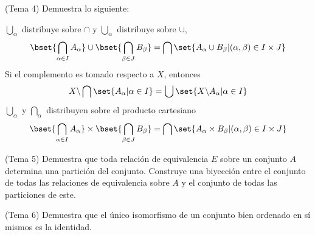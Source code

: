 \documentclass[fc]{tarea}
\newcommand{\menos}{\backslash}
\begin{document}
\begin{exercise}(Tema 4)
    Demuestra lo siguiente:
    \begin{tasks}
        \task $\bigcup_\alpha$ distribuye sobre $\cap$ y $\bigcup_\alpha$ distribuye sobre $\cup$,
        $$\bset{\bigcap_{\alpha \in I} A_\alpha} \cup \bset{\bigcap_{\beta \in J} B_\beta} = \bigcap \set{A_\alpha \cup B_\beta | (\alpha,\beta) \in I\times J}$$
        \task Si el complemento es tomado respecto a $X$, entonces
        $$X\menos \bigcap \set{A_\alpha | \alpha \in I} = \bigcup \set{X\menos A_\alpha | \alpha \in I}$$
        \task $\bigcup_\alpha$ y $\bigcap_\alpha$ distribuyen sobre el producto cartesiano
        $$\bset{\bigcap_{\alpha \in I} A_\alpha} \times \bset{\bigcap_{\beta \in J} B_\beta} = \bigcap \set{A_\alpha \times B_\beta | (\alpha, \beta)\in I \times J}$$
    \end{tasks}
\end{exercise}

\begin{exercise}(Tema 5)
Demuestra que toda relación de equivalencia $E$ sobre un conjunto $A$ determina una partición del conjunto. Construye una biyección entre el conjunto de todas las relaciones de equivalencia sobre $A$ y el conjunto de todas las particiones de este.
\end{exercise}

\begin{exercise}(Tema 6)
    Demuestra que el único isomorfismo de un conjunto bien ordenado en sí mismos es la identidad.
\end{exercise}
\end{document}

